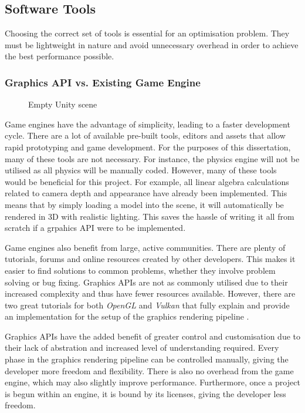 \documentclass[12pt]{article}
\newcommand{\wideimage}[2][]{%
  \makebox[\textwidth][c]{\texttt{[image: \#2]}}%
}
\begin{document}
    \subsection{Software Tools}

    Choosing the correct set of tools is essential for an optimisation problem. They must be lightweight in nature and avoid unnecessary overhead in order to achieve the best performance possible.

    \subsubsection{Graphics API vs. Existing Game Engine}

    \begin{figure}[H]
        \noindent\wideimage[]{unityInterface.png}
        \caption{Empty Unity\cite{unity} scene}
    \end{figure}

    Game engines have the advantage of simplicity, leading to a faster development cycle. There are a lot of available pre-built tools, editors and assets that allow rapid prototyping and game development. For the purposes of this dissertation, many of these tools are not necessary. For instance, the physics engine will not be utilised as all physics will be manually coded. However, many of these tools would be beneficial for this project. For example, all linear algebra calculations related to camera depth and appearance have already been implemented. This means that by simply loading a model into the scene, it will automatically be rendered in 3D with realistic lighting. This saves the hassle of writing it all from scratch if a grpahics API were to be implemented.

    Game engines also benefit from large, active communities. There are plenty of tutorials, forums and online resources created by other developers. This makes it easier to find solutions to common problems, whether they involve problem solving or bug fixing. Graphics APIs are not as commonly utilised due to their increased complexity and thus have fewer resources available. However, there are two great tutorials for both \textit{OpenGL} and \textit{Vulkan}\cite{vulkan} that fully explain and provide an implementation for the setup of the graphics rendering pipeline \cite{learnopengl}\cite{vulkantutorial}.

    Graphics APIs have the added benefit of greater control and customisation due to their lack of abstration and increased level of understanding required. Every phase in the graphics rendering pipeline can be controlled manually, giving the developer more freedom and flexibility. There is also no overhead from the game engine, which may also slightly improve performance. Furthermore, once a project is begun within an engine, it is bound by its licenses, giving the developer less freedom.
\end{document}
